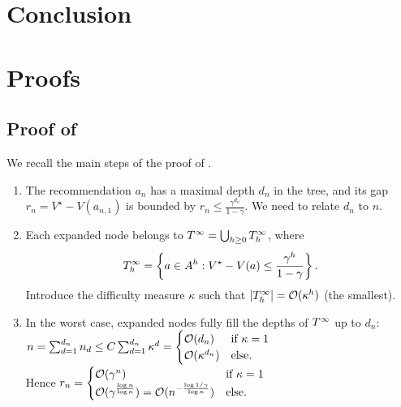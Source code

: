 \documentclass[runningheads]{llncs}
\begin{document}
%
%
%



\section*{Conclusion}

\FloatBarrier



\clearpage
\appendix

\section{Proofs}
\subsection{Proof of }
We recall the main steps of the proof of \citet{Hren2008optimistic}.\\

\begin{enumerate}
	\item The recommendation $a_n$ has a maximal depth $d_n$ in the tree, and its gap $r_n = V^\star - V({a_{n,1}})$ is bounded by $r_n \leq \frac{\gamma^{d_n}}{1-\gamma}$. We need to relate $d_n$ to $n$.
	
	\item Each expanded node belongs to $T^\infty = \bigcup_{h\geq 0} T_h^\infty$, where $$T_h^\infty = \left\{a\in A^h: V^\star-V(a) \leq \frac{\gamma^h}{1-\gamma}\right\}.$$ Introduce the difficulty measure $\kappa$ such that $|T_h^\infty| = \mathcal{O}(\kappa^h)$ (the smallest).
	
	\item In the worst case, expanded nodes fully fill the depths of $T^\infty$ up to $d_n$: $n = \sum_{d=1}^{d_n} n_d \leq  C\sum_{d=1}^{d_n} \kappa^d = \begin{cases}
	\mathcal{O}(d_n) &\text{if $\kappa=1$}\\
	\mathcal{O}(\kappa^{d_n}) &\text{else.}
	\end{cases}$\\
	Hence $r_n = \begin{cases}
	\mathcal{O}(\gamma^n) &\text{if $\kappa=1$}\\
	\mathcal{O}(\gamma^{\frac{\log n}{\log \kappa}}) = \mathcal{O}(n^{-\frac{\log 1/\gamma}{\log \kappa}}) &\text{else.}
	\end{cases}$
\end{enumerate}
\end{document}
